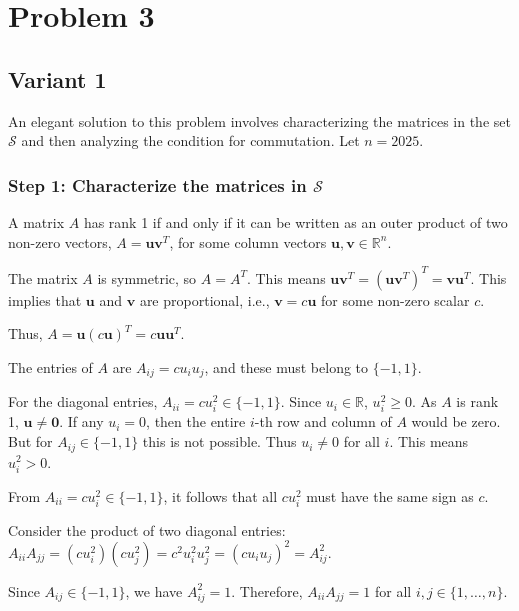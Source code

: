 \documentclass[12pt,a4paper]{article}
\theoremstyle{definition}
\begin{document}
\section{Problem 3}

        \subsection{Variant 1}

        An elegant solution to this problem involves characterizing the matrices in the set $\mathcal{S}$ and then analyzing the condition for commutation. Let $n = 2025$.

        \subsubsection*{Step 1: Characterize the matrices in $\mathcal{S}$}

        A matrix $A$ has rank 1 if and only if it can be written as an outer product of two non-zero vectors, $A = \mathbf{u}\mathbf{v}^T$, for some column vectors $\mathbf{u}, \mathbf{v} \in \mathbb{R}^n$.

        The matrix $A$ is symmetric, so $A = A^T$. This means $\mathbf{u}\mathbf{v}^T = (\mathbf{u}\mathbf{v}^T)^T = \mathbf{v}\mathbf{u}^T$. This implies that $\mathbf{u}$ and $\mathbf{v}$ are proportional, i.e., $\mathbf{v} = c\mathbf{u}$ for some non-zero scalar $c$.

        Thus, $A = \mathbf{u}(c\mathbf{u})^T = c\mathbf{u}\mathbf{u}^T$.

        The entries of $A$ are $A_{ij} = c u_i u_j$, and these must belong to $\{-1, 1\}$.

        For the diagonal entries, $A_{ii} = c u_i^2 \in \{-1, 1\}$. Since $u_i \in \mathbb{R}$, $u_i^2 \geq 0$. As $A$ is rank 1, $\mathbf{u} \neq \mathbf{0}$. If any $u_i=0$, then the entire $i$-th row and column of $A$ would be zero. But for $A_{ij} \in \{-1,1\}$ this is not possible. Thus $u_i \neq 0$ for all $i$. This means $u_i^2 > 0$.

        From $A_{ii} = c u_i^2 \in \{-1, 1\}$, it follows that all $c u_i^2$ must have the same sign as $c$.

        Consider the product of two diagonal entries: $A_{ii}A_{jj} = (c u_i^2)(c u_j^2) = c^2 u_i^2 u_j^2 = (c u_i u_j)^2 = A_{ij}^2$.

        Since $A_{ij} \in \{-1, 1\}$, we have $A_{ij}^2 = 1$. Therefore, $A_{ii}A_{jj} = 1$ for all $i, j \in \{1, \dots, n\}$.
\end{document}
